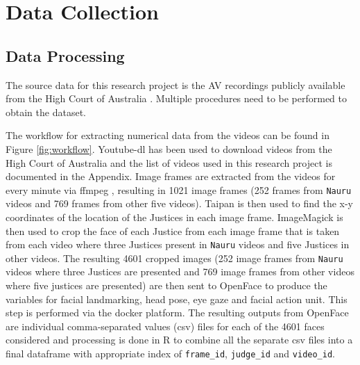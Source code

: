 \documentclass{monashthesis}
\begin{document}
\hypertarget{data-collection}{%
\chapter{Data Collection}\label{data-collection}}

\hypertarget{data-processing}{%
\section{Data Processing}\label{data-processing}}

The source data for this research project is the AV recordings publicly available from the High Court of Australia \autocite{highcourtau}. Multiple procedures need to be performed to obtain the dataset.

The workflow for extracting numerical data from the videos can be found in Figure \ref{fig:workflow}. Youtube-dl \autocite{youtube-dl} has been used to download videos from the High Court of Australia\autocite{highcourtau} and the list of videos used in this research project is documented in the Appendix. Image frames are extracted from the videos for every minute via ffmpeg \autocite{ffmpeg}, resulting in 1021 image frames (252 frames from \texttt{Nauru} videos and 769 frames from other five videos). Taipan \autocite{Taipan} is then used to find the x-y coordinates of the location of the Justices in each image frame. ImageMagick \autocite{ImageMagick} is then used to crop the face of each Justice from each image frame that is taken from each video where three Justices present in \texttt{Nauru} videos and five Justices in other videos. The resulting 4601 cropped images (252 image frames from \texttt{Nauru} videos where three Justices are presented and 769 image frames from other videos where five justices are presented) are then sent to OpenFace \autocite{baltrusaitis2018openface} to produce the variables for facial landmarking, head pose, eye gaze and facial action unit. This step is performed via the docker platform. The resulting outputs from OpenFace are individual comma-separated values (csv) files for each of the 4601 faces considered and processing is done in R to combine all the separate csv files into a final dataframe with appropriate index of \texttt{frame\_id}, \texttt{judge\_id} and \texttt{video\_id}.
\end{document}
